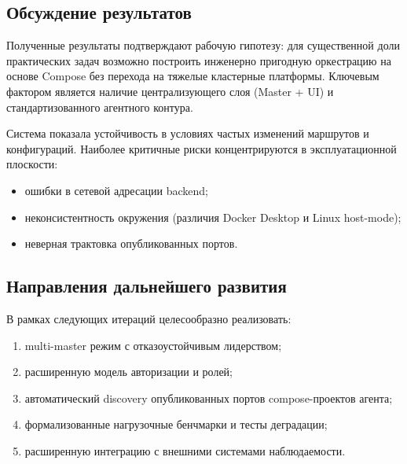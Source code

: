 \subsection{Обсуждение результатов}

Полученные результаты подтверждают рабочую гипотезу: для существенной доли практических задач возможно построить инженерно пригодную оркестрацию на основе Compose без перехода на тяжелые кластерные платформы. Ключевым фактором является наличие централизующего слоя (Master + UI) и стандартизованного агентного контура.

Система показала устойчивость в условиях частых изменений маршрутов и конфигураций. Наиболее критичные риски концентрируются в эксплуатационной плоскости:
\begin{itemize}[leftmargin=1.5cm]
  \item ошибки в сетевой адресации backend;
  \item неконсистентность окружения (различия Docker Desktop и Linux host-mode);
  \item неверная трактовка опубликованных портов.
\end{itemize}

\subsection{Направления дальнейшего развития}

В рамках следующих итераций целесообразно реализовать:
\begin{enumerate}[leftmargin=1.5cm]
  \item multi-master режим с отказоустойчивым лидерством;
  \item расширенную модель авторизации и ролей;
  \item автоматический discovery опубликованных портов compose-проектов агента;
  \item формализованные нагрузочные бенчмарки и тесты деградации;
  \item расширенную интеграцию с внешними системами наблюдаемости.
\end{enumerate}
